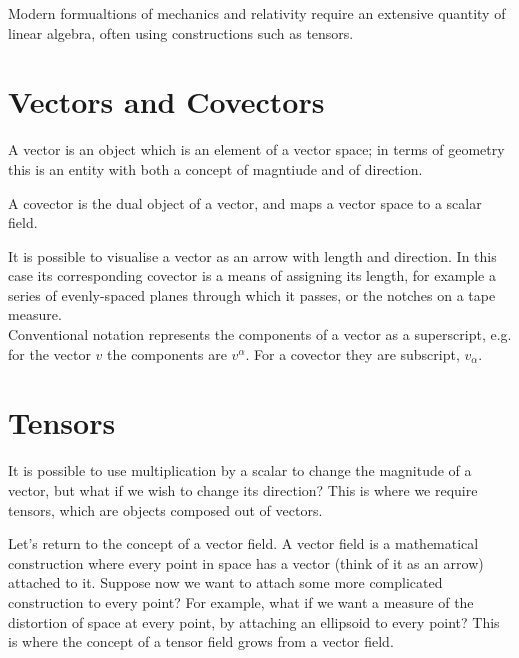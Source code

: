 Modern formualtions of mechanics and relativity require an extensive
quantity of linear algebra, often using constructions such as tensors.

\section{Vectors and Covectors}
\label{sec:vectors-covectors}

\begin{definition}[Vector]
  A vector is an object which is an element 
  of a vector space; in terms of geometry this is an entity with both a concept of magntiude and of direction.
\end{definition}

\begin{definition}[Covector]

  A covector is the dual object of a vector, 
    and maps a vector space to a scalar field.
\end{definition}

It is possible to visualise a vector as an arrow with length and
direction. In this case its corresponding covector is a means of
assigning its length, for example a series of evenly-spaced planes
through which it passes, or the notches on a tape measure.\\
Conventional notation represents the components of a vector as a
superscript, e.g. for the vector $v$ the components are
$v^\alpha$. For a covector they are subscript, $v_\alpha$.

\section{Tensors}
\label{sec:tensors}

It is possible to use multiplication by a scalar to change the
magnitude of a vector, but what if we wish to change its direction?
This is where we require tensors, which are objects composed out of
vectors.

Let's return to the concept of a vector field. A vector field is a
mathematical construction where every point in space has a vector
(think of it as an arrow) attached to it. Suppose now we want to
attach some more complicated construction to every point? For example,
what if we want a measure of the distortion of space at every point,
by attaching an ellipsoid to every point? This is where the concept of
a tensor field grows from a vector field.

